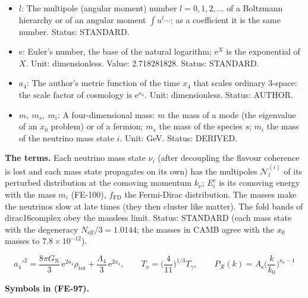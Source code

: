 \documentclass[
  10pt,
]{article}
\begin{document}
\begin{itemize}
  \(\Phi\): The lapse potential of the Newtonian gauge (the perturbation
  of the time component, \(1 + 2\Phi\)). Unit: dimensionless. Value: at
  most \(2.4\times10^{-5}\). Status: STANDARD.
\item
  \(l\): The multipole (angular moment) number \(l = 0, 1, 2, \dots\) of
  a Boltzmann hierarchy or of an angular moment \(\int u^l\cdots\); as a
  coefficient it is the same number. Status: STANDARD.
\item
  \(\mathrm{e}\): Euler's number, the base of the natural logarithm;
  \(\mathrm{e}^{X}\) is the exponential of \(X\). Unit: dimensionless.
  Value: 2.718281828. Status: STANDARD.
\item
  \(a_4\): The author's metric function of the time \(x_4\) that scales
  ordinary 3-space: the scale factor of cosmology is
  \(\mathrm{e}^{a_4}\). Unit: dimensionless. Status: AUTHOR.
\item
  \(m,\ m_s,\ m_i\): A four-dimensional mass: \(m\) the mass of a mode
  (the eigenvalue of an \(x_0\) problem) or of a fermion; \(m_s\) the
  mass of the species \(s\); \(m_i\) the mass of the neutrino mass state
  \(i\). Unit: GeV. Status: DERIVED.
\end{itemize}

\textbf{The terms.} Each neutrino mass state \(\nu_i\) (after decoupling
the flavour coherence is lost and each mass state propagates on its own)
has the multipoles \(\mathcal{N}^{(i)}_l\) of its perturbed distribution
at the comoving momentum \(k_\nu\); \(E^{\mathrm{c}}_i\) is its comoving
energy with the mass \(m_i\) (FE-100), \(f_{\mathrm{FD}}\) the
Fermi-Dirac distribution. The masses make the neutrinos slow at late
times (they then cluster like matter). The fold bands of dirac16complex
obey the massless limit. Status: STANDARD (each mass state with the
degeneracy \(N_{\mathrm{eff}}/3 = 1.0144\); the masses in CAMB agree
with the \(x_0\) masses to \(7.8\times10^{-12}\)).

\[
a_4'^2 = \frac{8\pi G_{\mathrm{N}}}{3}\,\mathrm{e}^{2a_4}\rho_{\mathrm{tot}} +
 \frac{\Lambda_4}{3}\,\mathrm{e}^{2a_4},\qquad
T_\nu = \Big(\frac{4}{11}\Big)^{1/3}T_\gamma,\qquad
P_{\mathcal{R}}(k) = A_{\mathrm{s}}\Big(\frac{k}{k_0}\Big)^{n_{\mathrm{s}} - 1} \tag{FE-97}
\]

\textbf{Symbols in (FE-97).}
\end{document}
